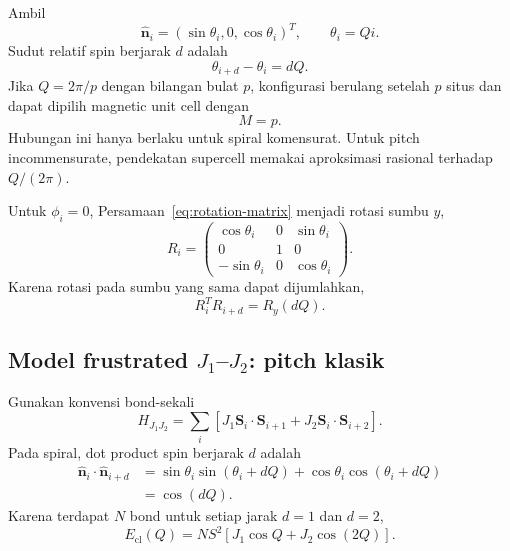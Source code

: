 \documentclass[11pt,a4paper]{article}
\newcommand{\vS}{\bm S}
\newcommand{\vn}{\widehat{\bm n}}
\begin{document}
Ambil
\begin{equation}
\vn_i=(\sin\theta_i,0,\cos\theta_i)^T,
\qquad \theta_i=Qi.
\label{eq:xz-spiral}
\end{equation}
Sudut relatif spin berjarak $d$ adalah
\begin{equation}
\theta_{i+d}-\theta_i=dQ.
\end{equation}
Jika $Q=2\pi/p$ dengan bilangan bulat $p$, konfigurasi berulang setelah $p$ situs dan dapat dipilih magnetic unit cell dengan
\begin{equation}
M=p.
\end{equation}
Hubungan ini hanya berlaku untuk spiral komensurat. Untuk pitch incommensurate, pendekatan supercell memakai aproksimasi rasional terhadap $Q/(2\pi)$.

Untuk $\phi_i=0$, Persamaan~\eqref{eq:rotation-matrix} menjadi rotasi sumbu $y$,
\begin{equation}
R_i=
\begin{pmatrix}
\cos\theta_i&0&\sin\theta_i\\
0&1&0\\
-\sin\theta_i&0&\cos\theta_i
\end{pmatrix}.
\end{equation}
Karena rotasi pada sumbu yang sama dapat dijumlahkan,
\begin{equation}
R_i^TR_{i+d}=R_y(dQ).
\end{equation}

\subsection{Model frustrated \texorpdfstring{$J_1$--$J_2$}{J1--J2}: pitch klasik}

Gunakan konvensi bond-sekali
\begin{equation}
H_{J_1J_2}=\sum_i
\left[J_1\vS_i\cdot\vS_{i+1}
+J_2\vS_i\cdot\vS_{i+2}\right].
\label{eq:j1j2-hamiltonian}
\end{equation}
Pada spiral, dot product spin berjarak $d$ adalah
\begin{align}
\vn_i\cdot\vn_{i+d}
&=\sin\theta_i\sin(\theta_i+dQ)+\cos\theta_i\cos(\theta_i+dQ)\\
&=\cos(dQ).
\end{align}
Karena terdapat $N$ bond untuk setiap jarak $d=1$ dan $d=2$,
\begin{equation}
E_{\mathrm{cl}}(Q)
=NS^2[J_1\cos Q+J_2\cos(2Q)].
\label{eq:j1j2-classical-energy}
\end{equation}
\end{document}
